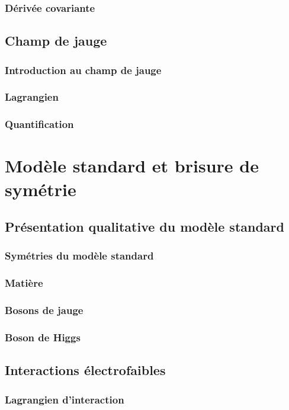 \documentclass{article}
\begin{document}
			\subsubsection{Dérivée covariante}
			
		\subsection{Champ de jauge}
			\subsubsection{Introduction au champ de jauge}
			\subsubsection{Lagrangien}
			\subsubsection{Quantification}
	
		
		\section{Modèle standard et brisure de symétrie}
		
			\subsection{Présentation qualitative du modèle standard}
				\subsubsection{Symétries du modèle standard}
				\subsubsection{Matière}
				\subsubsection{Bosons de jauge}
				\subsubsection{Boson de Higgs}
			\subsection{Interactions électrofaibles}
				\subsubsection{Lagrangien d'interaction}
\end{document}
